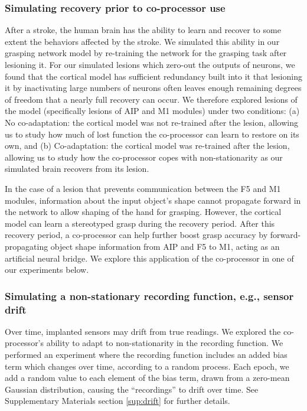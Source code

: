 \documentclass[12pt]{iopart}
\begin{document}
\subsubsection{Simulating recovery prior to co-processor use}
After a stroke, the human brain has the ability to learn and recover to some extent the behaviors
affected by the stroke. We simulated this ability in our grasping network model by re-training the 
network for the grasping task after lesioning it. For our simulated lesions which zero-out 
the outputs of neurons, we found that the cortical model has sufficient redundancy built into it that lesioning it by
inactivating large numbers of neurons often leaves enough remaining degrees of freedom that a
nearly full recovery can occur. We therefore explored lesions of  the model (specifically lesions of AIP and M1 modules)
under two conditions: (a) No co-adaptation: the cortical model was not re-trained after the lesion, allowing us to study
how much of lost function the co-processor can learn to restore on its own, and (b) Co-adaptation: the cortical model
was re-trained after the lesion, allowing us to study how the co-processor copes with non-stationarity as our simulated
brain recovers from its lesion.

In the case of a lesion that prevents communication between the F5 and M1 modules, information about
the input object's shape cannot propagate forward in the network to allow shaping of the hand for
grasping. However, the cortical model can learn a stereotyped grasp during the recovery period. After this recovery
period, a co-processor can help further boost grasp accuracy by forward-propagating object shape information
from AIP and F5 to M1, acting as an artificial neural bridge. We explore this application of the
co-processor in one of our experiments below.

\subsubsection{Simulating a non-stationary recording function, e.g., sensor drift}
Over time, implanted sensors may drift from true readings. We explored the co-processor's ability to adapt to
non-stationarity in the recording function. We performed an experiment where the recording function
includes an added bias term which changes over time, according to a random process. Each epoch, we
add a random value to each element of the bias term, drawn from a zero-mean Gaussian distribution, causing the
``recordings'' to drift over time. See Supplementary Materials section \ref{sup:drift} for further details.
\end{document}
